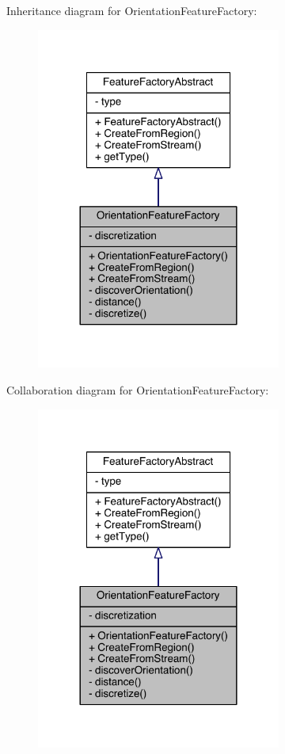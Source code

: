 Inheritance diagram for Orientation\+Feature\+Factory\+:\nopagebreak
\begin{figure}[H]
\begin{center}
\leavevmode
\includegraphics[width=228pt]{class_orientation_feature_factory__inherit__graph}
\end{center}
\end{figure}


Collaboration diagram for Orientation\+Feature\+Factory\+:\nopagebreak
\begin{figure}[H]
\begin{center}
\leavevmode
\includegraphics[width=228pt]{class_orientation_feature_factory__coll__graph}
\end{center}
\end{figure}


